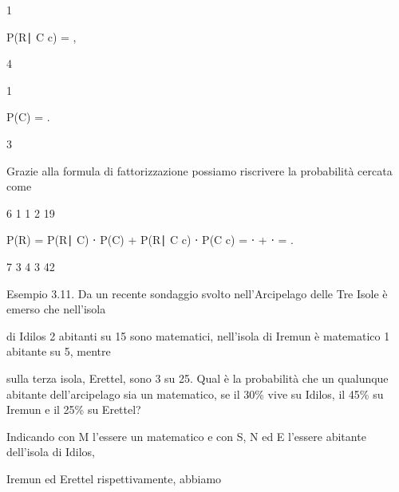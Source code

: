 \documentclass[a4paper,portrait,12pt]{article}
\begin{document}
1


\begin{flushleft}
P(R∣ C c) = ,
\end{flushleft}


4





1


\begin{flushleft}
P(C) = .
\end{flushleft}


3





\begin{flushleft}
Grazie alla formula di fattorizzazione possiamo riscrivere la probabilit\`{a} cercata come
\end{flushleft}


6 1 1 2 19


\begin{flushleft}
P(R) = P(R∣ C) ⋅ P(C) + P(R∣ C c) ⋅ P(C c) = ⋅ + ⋅ = .
\end{flushleft}


7 3 4 3 42


\begin{flushleft}
Esempio 3.11. Da un recente sondaggio svolto nell'Arcipelago delle Tre Isole \`{e} emerso che nell'isola
\end{flushleft}


\begin{flushleft}
di Idilos 2 abitanti su 15 sono matematici, nell'isola di Iremun \`{e} matematico 1 abitante su 5, mentre
\end{flushleft}


\begin{flushleft}
sulla terza isola, Erettel, sono 3 su 25. Qual \`{e} la probabilit\`{a} che un qualunque abitante dell'arcipelago sia un matematico, se il 30\% vive su Idilos, il 45\% su Iremun e il 25\% su Erettel?
\end{flushleft}


\begin{flushleft}
Indicando con M l'essere un matematico e con S, N ed E l'essere abitante dell'isola di Idilos,
\end{flushleft}


\begin{flushleft}
Iremun ed Erettel rispettivamente, abbiamo
\end{flushleft}
\end{document}
